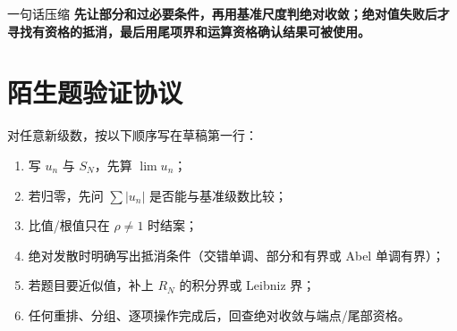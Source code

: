 \documentclass[11pt,a4paper,fontset=fandol]{ctexart}
\begin{document}
\begin{corebox}{一句话压缩}
\textbf{先让部分和过必要条件，再用基准尺度判绝对收敛；绝对值失败后才寻找有资格的抵消，最后用尾项界和运算资格确认结果可被使用。}
\end{corebox}

\section{陌生题验证协议}
对任意新级数，按以下顺序写在草稿第一行：
\begin{enumerate}
  \item 写 $u_n$ 与 $S_N$，先算 $\lim u_n$；
  \item 若归零，先问 $\sum|u_n|$ 是否能与基准级数比较；
  \item 比值/根值只在 $\rho\ne1$ 时结案；
  \item 绝对发散时明确写出抵消条件（交错单调、部分和有界或 Abel 单调有界）；
  \item 若题目要近似值，补上 $R_N$ 的积分界或 Leibniz 界；
  \item 任何重排、分组、逐项操作完成后，回查绝对收敛与端点/尾部资格。
\end{enumerate}
\end{document}
